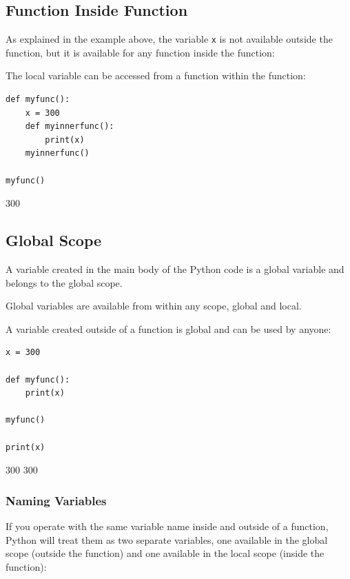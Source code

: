 \documentclass[12pt,a4paper]{article}
\newcommand{\code}[1]{%
	\colorbox{backcolour}{\lstinline{#1}}%
}
\begin{document}
\subsection{Function Inside Function}

As explained in the example above, the variable \code{x} is not available
outside the function, but it is available for any function inside the
function: 

\begin{ebox}
The local variable can be accessed from a function within the function:
	\begin{lstlisting}
def myfunc():
    x = 300
    def myinnerfunc():
        print(x)
    myinnerfunc()

myfunc()
	\end{lstlisting}
\tcblower
	\begin{vercode}
300
	\end{vercode}
\end{ebox}
\subsection{Global Scope}

A variable created in the main body of the Python code is a global
variable and belongs to the global scope.

Global variables are available from within any scope, global and local.

\begin{ebox}
A variable created outside of a function is global and can be used by
anyone:
	\begin{lstlisting}
x = 300

def myfunc():
    print(x)

myfunc()

print(x)
	\end{lstlisting}
\tcblower
	\begin{vercode}
300
300
	\end{vercode}
\end{ebox}

\subsubsection{Naming Variables}

If you operate with the same variable name inside and outside of a
function, Python will treat them as two separate variables, one available
in the global scope (outside the function) and one available in the local
scope (inside the function):
\end{document}
